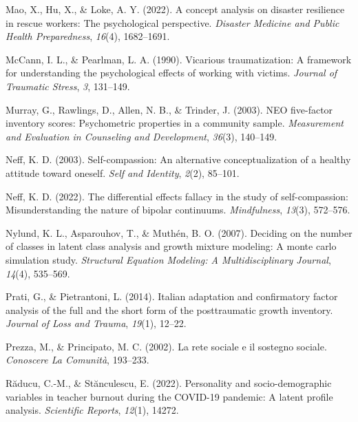 \documentclass[
  man]{apa7}
\newlength{\cslhangindent}
\newlength{\cslentryspacingunit} %
\newenvironment{CSLReferences}[2] %
 {%
  \setlength{\parindent}{0pt}
  \ifodd #1
  \let\oldpar\par
  \def\par{\hangindent=\cslhangindent\oldpar}
  \fi
  \setlength{\parskip}{#2\cslentryspacingunit}
 }%
 {}
\begin{document}
\begin{CSLReferences}{1}{0}
\leavevmode{}%
Mao, X., Hu, X., \& Loke, A. Y. (2022). A concept analysis on disaster resilience in rescue workers: The psychological perspective. \emph{Disaster Medicine and Public Health Preparedness}, \emph{16}(4), 1682--1691.

\leavevmode{}%
McCann, I. L., \& Pearlman, L. A. (1990). Vicarious traumatization: A framework for understanding the psychological effects of working with victims. \emph{Journal of Traumatic Stress}, \emph{3}, 131--149.

\leavevmode{}%
Murray, G., Rawlings, D., Allen, N. B., \& Trinder, J. (2003). NEO five-factor inventory scores: Psychometric properties in a community sample. \emph{Measurement and Evaluation in Counseling and Development}, \emph{36}(3), 140--149.

\leavevmode{}%
Neff, K. D. (2003). Self-compassion: An alternative conceptualization of a healthy attitude toward oneself. \emph{Self and Identity}, \emph{2}(2), 85--101.

\leavevmode{}%
Neff, K. D. (2022). The differential effects fallacy in the study of self-compassion: Misunderstanding the nature of bipolar continuums. \emph{Mindfulness}, \emph{13}(3), 572--576.

\leavevmode{}%
Nylund, K. L., Asparouhov, T., \& Muthén, B. O. (2007). Deciding on the number of classes in latent class analysis and growth mixture modeling: A monte carlo simulation study. \emph{Structural Equation Modeling: A Multidisciplinary Journal}, \emph{14}(4), 535--569.

\leavevmode{}%
Prati, G., \& Pietrantoni, L. (2014). Italian adaptation and confirmatory factor analysis of the full and the short form of the posttraumatic growth inventory. \emph{Journal of Loss and Trauma}, \emph{19}(1), 12--22.

\leavevmode{}%
Prezza, M., \& Principato, M. C. (2002). La rete sociale e il sostegno sociale. \emph{Conoscere La Comunit{à}}, 193--233.

\leavevmode{}%
Răducu, C.-M., \& Stănculescu, E. (2022). Personality and socio-demographic variables in teacher burnout during the COVID-19 pandemic: A latent profile analysis. \emph{Scientific Reports}, \emph{12}(1), 14272.


\end{CSLReferences}
\end{document}
